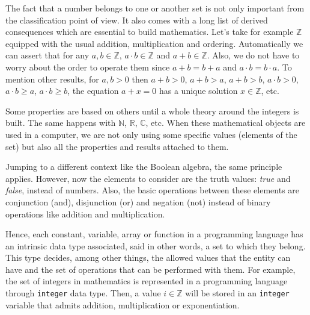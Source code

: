 The fact that a number belongs to one or another set is not only important from the classification point of view.
It also comes with a long list of derived consequences which are essential to build mathematics. 
Let's take for example $\mathbb{Z}$ equipped with the usual addition, multiplication and ordering. 
Automatically we can assert that for any $a,b\in\mathbb{Z}$, $a\cdot b\in\mathbb{Z}$ and $a+b\in\mathbb{Z}$.
Also, we do not have to worry about the order to operate them since $a+b=b+a$ and $a\cdot b = b\cdot a$.
To mention other results, for $a,b>0$ then $a+b>0$, $a+b>a$, $a+b>b$, $a\cdot b>0$, $a\cdot b\geq a$, $a\cdot b\geq b$, the equation $a+x = 0$ has a unique solution $x\in\mathbb{Z}$, etc.

Some properties are based on others until a whole theory around the integers is built. 
The same happens with $\mathbb{N}$, $\mathbb{R}$, $\mathbb{C}$, etc. 
When these mathematical objects are used in a computer, 
we are not only using some specific values (elements of the set) but also
all the properties and results attached to them. 

Jumping to a different context like the Boolean algebra, the same principle applies.
However, now the elements to consider are the truth values: \textit{true} and \textit{false}, instead of numbers.
Also, the basic operations between these elements are conjunction (and), disjunction (or) and negation (not) 
instead of binary operations like addition and multiplication.

Hence, each constant, variable, array or function in a programming language has an intrinsic data type associated, 
said in other words, a set to which they belong. 
This type decides, among other things, the allowed values that the entity can have and the set of operations that can be performed with them.
For example, the set of integers in mathematics is represented in a programming language through \texttt{integer} data type. 
Then, a value $i\in\mathbb{Z}$ will be stored in an \texttt{integer} variable that admits addition, multiplication or exponentiation.


        \newpage
